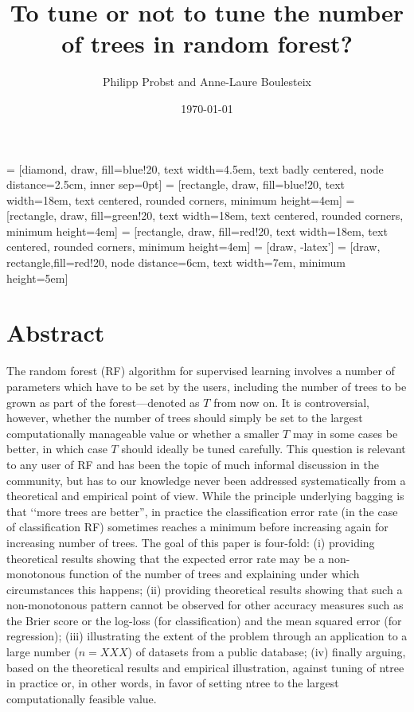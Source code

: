 \documentclass[paper=a4
               ,12pt
               ,DIV=12
               ,parskip=half
               ,titlepage=on
               ,headinclude 
               ,footinclude
               ,headsepline
               ,footsepline         %
               ,ilines 
               ]{scrartcl}
\title{To tune or not to tune the number of trees in random forest?}
\author{Philipp Probst and Anne-Laure Boulesteix}
\date{\today}
\subtitle{}
\begin{document}
 
\maketitle
 = [diamond, draw, fill=blue!20, 
    text width=4.5em, text badly centered, node distance=2.5cm, inner sep=0pt]
 = [rectangle, draw, fill=blue!20, 
    text width=18em, text centered, rounded corners, minimum height=4em]
 = [rectangle, draw, fill=green!20, 
    text width=18em, text centered, rounded corners, minimum height=4em]
 = [rectangle, draw, fill=red!20, 
    text width=18em, text centered, rounded corners, minimum height=4em]
 = [draw, -latex']
 = [draw, rectangle,fill=red!20, node distance=6cm, text width=7em,
    minimum height=5em]

\section*{Abstract}
The random forest (RF) algorithm for supervised learning involves a number of parameters which have to be set by the users, including the number of trees to be grown as part of the forest---denoted as $T$ from now on. 
It is controversial, however, whether the number of trees should simply be set to the largest computationally manageable value or whether a smaller $T$ may in some cases be better, in which case $T$ should ideally be 
tuned carefully. This question is relevant to any user of RF and has been the topic of much informal discussion in the community, but has to our knowledge never been addressed systematically from a theoretical and empirical 
point of view. While the principle underlying bagging is that \lq\lq more trees are better'', in practice the classification error rate (in the case of classification RF) sometimes reaches a minimum before increasing 
again for increasing number of trees. 
The goal of this paper is four-fold: (i) providing theoretical results showing that the expected error rate may be a non-monotonous function of the number of trees and explaining under which circumstances this happens; 
(ii) providing theoretical results showing that such a non-monotonous pattern cannot be observed for other accuracy measures such as the Brier score or the log-loss (for classification) and the mean squared error 
(for regression); (iii) illustrating the extent of the problem through an application to a large number ($n=XXX$) of datasets from a public database; (iv) finally arguing, based on the theoretical results and empirical 
illustration, against tuning of ntree in practice or, in other words, in favor of setting ntree to the largest computationally feasible value.
\end{document}
